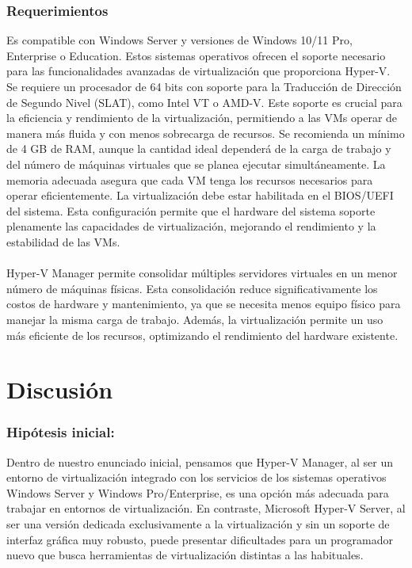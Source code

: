 \documentclass[journal]{IEEEtran}
\begin{document}
\subsubsection{Requerimientos}
Es compatible con Windows Server y versiones de Windows 10/11 Pro, Enterprise o Education. Estos sistemas operativos ofrecen el soporte necesario para las funcionalidades avanzadas de virtualización que proporciona Hyper-V. \cite{HVMM}
\\
Se requiere un procesador de 64 bits con soporte para la Traducción de Dirección de Segundo Nivel (SLAT), como Intel VT o AMD-V. Este soporte es crucial para la eficiencia y rendimiento de la virtualización, permitiendo a las VMs operar de manera más fluida y con menos sobrecarga de recursos. \cite{HVM}
Se recomienda un mínimo de 4 GB de RAM, aunque la cantidad ideal dependerá de la carga de trabajo y del número de máquinas virtuales que se planea ejecutar simultáneamente. La memoria adecuada asegura que cada VM tenga los recursos necesarios para operar eficientemente.
La virtualización debe estar habilitada en el BIOS/UEFI del sistema. Esta configuración permite que el hardware del sistema soporte plenamente las capacidades de virtualización, mejorando el rendimiento y la estabilidad de las VMs.\cite{HVM}
\\ \\
Hyper-V Manager permite consolidar múltiples servidores virtuales en un menor número de máquinas físicas. Esta consolidación reduce significativamente los costos de hardware y mantenimiento, ya que se necesita menos equipo físico para manejar la misma carga de trabajo. Además, la virtualización permite un uso más eficiente de los recursos, optimizando el rendimiento del hardware existente.

\section{Discusión}
\subsubsection{Hipótesis inicial:}
Dentro de nuestro enunciado inicial, pensamos que Hyper-V Manager, al ser un entorno de virtualización integrado con los servicios de los sistemas operativos Windows Server y Windows Pro/Enterprise, es una opción más adecuada para trabajar en entornos de virtualización. En contraste, Microsoft Hyper-V Server, al ser una versión dedicada exclusivamente a la virtualización y sin un soporte de interfaz gráfica muy robusto, puede presentar dificultades para un programador nuevo que busca herramientas de virtualización distintas a las habituales.\\
\end{document}
